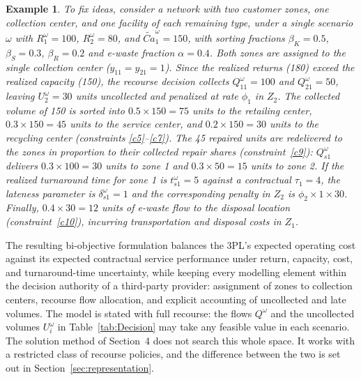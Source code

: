 \documentclass[11pt, a4paper]{article}
\newtheorem*{example}{Example}
\begin{document}
\begin{example}
To fix ideas, consider a network with two customer zones, one collection center, and one facility of each remaining type, under a single scenario $\omega$ with $R_1^{\omega}=100$, $R_2^{\omega}=80$, and $\widetilde{Ca}_1^{\omega}=150$, with sorting fractions $\beta_K=0.5$, $\beta_S=0.3$, $\beta_R=0.2$ and e-waste fraction
$\alpha=0.4$. Both zones are assigned to the single collection center ($y_{11}=y_{21}=1$). Since the realized returns (180) exceed the realized capacity (150), the recourse decision collects $Q_{11}^{\omega}=100$ and $Q_{21}^{\omega}=50$, leaving $U_2^{\omega}=30$ units uncollected and penalized at rate $\phi_1$ in $Z_2$. The collected volume of 150 is sorted into
$0.5 \times 150 = 75$ units to the retailing center,
$0.3 \times 150 = 45$ units to the service center, and
$0.2 \times 150 = 30$ units to the recycling center (constraints
\ref{c5}--\ref{c7}). The 45 repaired units are redelivered to the zones in proportion to their collected repair shares (constraint~\ref{c9}):
$Q_{s1}^{\omega}$ delivers $0.3 \times 100 = 30$ units to zone 1 and
$0.3 \times 50 = 15$ units to zone 2. If the realized turnaround time
for zone 1 is $t_{s1}^{\omega}=5$ against a contractual $\tau_1=4$,
the lateness parameter is $\delta_{s1}^{\omega}=1$ and the
corresponding penalty in $Z_2$ is $\phi_2 \times 1 \times 30$.
Finally, $0.4 \times 30 = 12$ units of e-waste flow to the disposal
location (constraint~\ref{c10}), incurring
transportation and disposal costs in $Z_1$.
\end{example}
The resulting bi-objective formulation balances the 3PL's expected operating cost against its expected contractual service performance under return, capacity, cost, and turnaround-time uncertainty, while keeping every modelling element within the decision authority of a third-party provider: assignment of zones to collection centers, recourse flow allocation, and explicit accounting of uncollected and late volumes. The model is stated with full recourse: the flows $Q^{\omega}$ and the uncollected volumes $U_i^{\omega}$ in Table~\ref{tab:Decision} may take any feasible value in each scenario. The solution method of Section~4 does not search this whole space. It works with a restricted class of recourse policies, and the difference between the two is set out in Section~\ref{sec:representation}.
\end{document}
